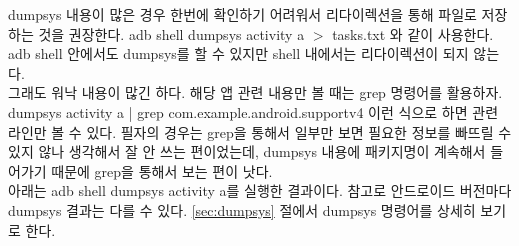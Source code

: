 dumpsys 내용이 많은 경우 한번에 확인하기 어려워서 리다이렉션을 통해 파일로 저장하는 것을 권장한다. adb shell dumpsys activity a  $>$ tasks.txt 와 같이 사용한다. adb shell 안에서도 dumpsys를 할 수 있지만 shell 내에서는 리다이렉션이 되지 않는다.\\

그래도 워낙 내용이 많긴 하다. 해당 앱 관련 내용만 볼 때는 grep 명령어를 활용하자. dumpsys activity a | grep com.example.android.supportv4 이런 식으로 하면 관련 라인만 볼 수 있다. 필자의 경우는 grep을 통해서 일부만 보면 필요한 정보를 빠뜨릴 수 있지 않나 생각해서 잘 안 쓰는 편이었는데, dumpsys 내용에 패키지명이 계속해서 들어가기 때문에 grep을 통해서 보는 편이 낫다.\\

아래는 adb shell dumpsys activity a를 실행한 결과이다. 참고로 안드로이드 버전마다 dumpsys 결과는 다를 수 있다. \ref{sec:dumpsys} 절에서 dumpsys 명령어를 상세히 보기로 한다.
